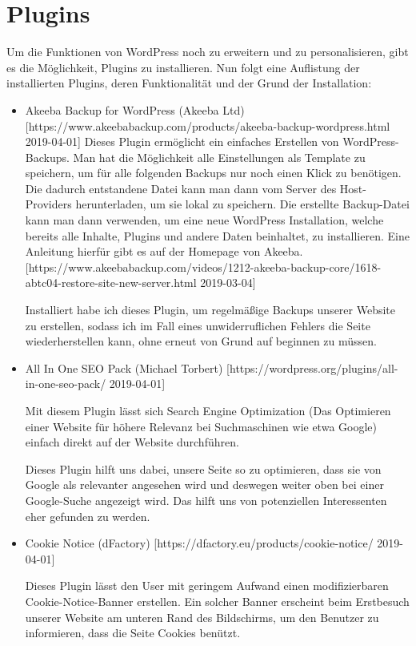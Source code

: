 \section{Plugins}
Um die Funktionen von WordPress noch zu erweitern und zu personalisieren, gibt es die Möglichkeit, Plugins zu installieren. Nun folgt eine Auflistung der installierten Plugins, deren Funktionalität und der Grund der Installation:
\begin{itemize}
    \item Akeeba Backup for WordPress (Akeeba Ltd) [https://www.akeebabackup.com/products/akeeba-backup-wordpress.html 2019-04-01]
    Dieses Plugin ermöglicht ein einfaches Erstellen von WordPress-Backups. Man hat die Möglichkeit alle Einstellungen als Template zu speichern, um für alle folgenden Backups nur noch einen Klick zu benötigen. Die dadurch entstandene Datei kann man dann vom Server des Host-Providers herunterladen, um sie lokal zu speichern.
    Die erstellte Backup-Datei kann man dann verwenden, um eine neue WordPress Installation, welche bereits alle Inhalte, Plugins und andere Daten beinhaltet, zu installieren.
    Eine Anleitung hierfür gibt es auf der Homepage von Akeeba. [https://www.akeebabackup.com/videos/1212-akeeba-backup-core/1618-abtc04-restore-site-new-server.html 2019-03-04]

    Installiert habe ich dieses Plugin, um regelmäßige Backups unserer Website zu erstellen, sodass ich im Fall eines unwiderruflichen Fehlers die Seite wiederherstellen kann, ohne erneut von Grund auf beginnen zu müssen.
    \item All In One SEO Pack (Michael Torbert) [https://wordpress.org/plugins/all-in-one-seo-pack/ 2019-04-01]

    Mit diesem Plugin lässt sich Search Engine Optimization (Das Optimieren einer Website für höhere Relevanz bei Suchmaschinen wie etwa Google) einfach direkt auf der Website durchführen.

    Dieses Plugin hilft uns dabei, unsere Seite so zu optimieren, dass sie von Google als relevanter angesehen wird und deswegen weiter oben bei einer Google-Suche angezeigt wird. Das hilft uns von potenziellen Interessenten eher gefunden zu werden.

    \item Cookie Notice (dFactory) [https://dfactory.eu/products/cookie-notice/ 2019-04-01]

    Dieses Plugin lässt den User mit geringem Aufwand einen modifizierbaren Cookie-Notice-Banner erstellen. Ein solcher Banner erscheint beim Erstbesuch unserer Website am unteren Rand des Bildschirms, um den Benutzer zu informieren, dass die Seite Cookies benützt.


\end{itemize}
